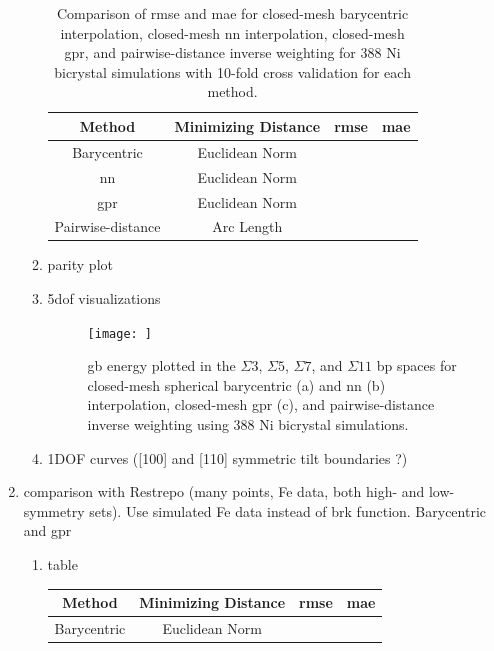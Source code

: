 \documentclass[preprint,12pt]{elsarticle}
\begin{document}
\begin{enumerate}
\begin{enumerate}
\begin{table}[]
\begin{tabular}{c c c c}
                 Method & Minimizing Distance & \acrshort{rmse} & \acrshort{mae} \\
                 \hline
                 Barycentric & Euclidean Norm & & \\
                 \acrshort{nn} & Euclidean Norm & & \\
                 \acrshort{gpr} & Euclidean Norm & & \\
                 Pairwise-distance & Arc Length & &
            \end{tabular}
            \caption{Comparison of \acrfull{rmse} and \acrfull{mae} for closed-mesh barycentric interpolation, closed-mesh \acrfull{nn} interpolation, closed-mesh \acrfull{gpr}, and pairwise-distance inverse weighting for 388 Ni bicrystal simulations with 10-fold cross validation for each method.}
            \label{tab:chesser-comp}
        \end{table}
        \item parity plot
        \item \gls{5dof} visualizations
        \begin{figure}
            \centering
            \texttt{[image: ]}
            \caption{\acrfull{gb} energy plotted in the $\Sigma{3}$, $\Sigma{5}$, $\Sigma{7}$, and $\Sigma{11}$ \acrlong{bp} spaces for closed-mesh spherical barycentric (a) and \acrlong{nn} (b) interpolation, closed-mesh \acrlong{gpr} (c), and pairwise-distance inverse weighting using 388 Ni bicrystal simulations.}
            \label{fig:chesser-5dof}
        \end{figure}
        \item 1DOF curves ([100] and [110] symmetric tilt boundaries ?)
    \end{enumerate}
    \item comparison with Restrepo \cite{EcheverriRestrepo2014UsingEnergies} (many points, Fe data, both high- and low-symmetry sets). Use simulated Fe data instead of \gls{brk} function. Barycentric and \gls{gpr}
    \begin{enumerate}
        \item table
        \begin{table}[]
            \centering
            \begin{tabular}{c c c c}
                \hline
                 Method & Minimizing Distance & \acrshort{rmse} & \acrshort{mae} \\
                 \hline
                 Barycentric & Euclidean Norm & & \\

\end{tabular}
\end{table}
\end{enumerate}
\end{enumerate}
\end{document}
